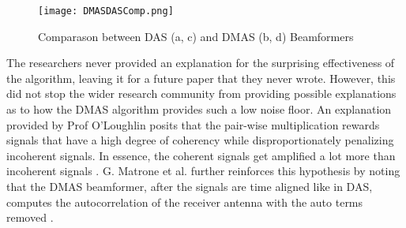 \begin{figure}[!h]
    \texttt{[image: DMASDASComp.png]}
    \centering
    \caption{Comparason between DAS (a, c) and DMAS (b, d) Beamformers}
    \label{fig:DMASDASComp}
\end{figure}

The researchers never provided an explanation for the surprising effectiveness of the algorithm, leaving it for a future
paper that they never wrote. However, this did not stop the wider research community from providing possible
explanations as to how the DMAS algorithm provides such a low noise floor. An explanation provided by Prof O'Loughlin
posits that the pair-wise multiplication rewards signals that have a high degree of coherency while disproportionately
penalizing incoherent signals. In essence, the coherent signals get amplified a lot more than incoherent signals
\cite{oloughlinComparingRadarBasedBreast2019}. G. Matrone et al. further reinforces this hypothesis by noting that the DMAS beamformer,
after the signals are time aligned like in DAS, computes the autocorrelation of the receiver antenna with the auto
terms removed \cite{g.matroneDelayMultiplySum2015}.